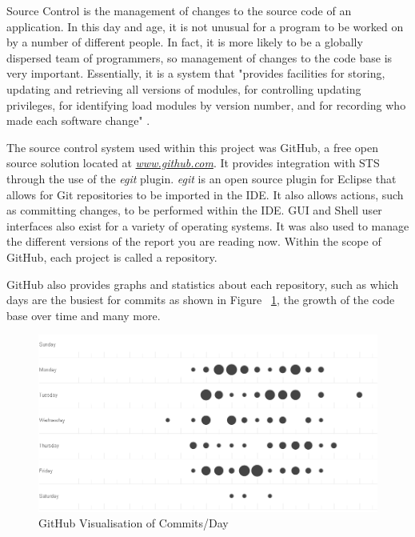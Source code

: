 Source Control is the management of changes to the source code of an application. In this day and age, it is not unusual for a program to be worked on by a number of different people. In fact, it is more likely to be a globally dispersed team of programmers, so management of changes to the code base is very important. Essentially, it is a system that "provides facilities for storing, updating and retrieving all versions of modules, for controlling updating privileges, for identifying load modules by version number, and for recording who made each software change" \parencite{rochkind1975source}.

The source control system used within this project was GitHub, a free open source solution located at \textit{\href{http://www.github.com}{www.github.com}}. It provides integration with STS through the use of the \textit{egit} plugin. \textit{egit} is an open source plugin for Eclipse that allows for Git repositories to be imported in the IDE. It also allows actions, such as committing changes, to be performed within the IDE. GUI and Shell user interfaces also exist for a variety of operating systems. It was also used to manage the different versions of the report you are reading now. Within the scope of GitHub, each project is called a repository.

GitHub also provides graphs and statistics about each repository, such as which days are the busiest for commits as shown in Figure ~\ref{fig:git}, the growth of the code base over time and many more.

\begin{figure}[H]
\begin{center}
\includegraphics[width=15cm]{git.png}
\end{center}
\caption{GitHub Visualisation of Commits/Day}
\label{fig:git}
\end{figure}

